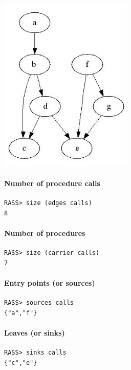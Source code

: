\documentclass[11pt]{article}
\begin{document}
\begin{center}
\includegraphics[width=2.5in]{calls}
\end{center}

\paragraph{Number of procedure calls} 

\begin{verbatim} 
RASS> size (edges calls)
8
\end{verbatim}

\paragraph{Number of procedures} 

\begin{verbatim} 
RASS> size (carrier calls)
7
\end{verbatim}

\paragraph{Entry points (or sources)} 

\begin{verbatim} 
RASS> sources calls
{"a","f"}
\end{verbatim} 

\paragraph{Leaves (or sinks)} 

\begin{verbatim} 
RASS> sinks calls
{"c","e"}
\end{verbatim} 
\end{document}
